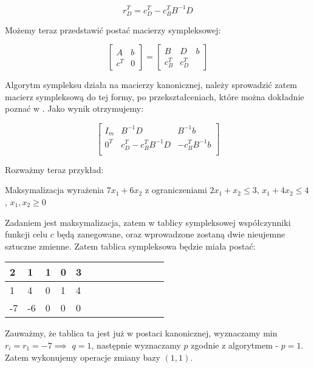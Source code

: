 \documentclass{classrep}
\newcommand{\tnhl}{\tabularnewline\hline}
\begin{document}
\begin{equation}
r^{T}_{D} = c^{T}_{D} - c^{T}_{B} B^{-1} D
\end{equation}

Możemy teraz przedstawić postać macierzy sympleksowej:

\begin{equation}
\left[ \begin{smallmatrix} A & b \\ c^{T} & 0  \end{smallmatrix} \right] =
\left[ \begin{smallmatrix} B &  D & b \\c^{T}_{B} & c^{T}_{D} \end{smallmatrix} \right]
\end{equation}

Algorytm sympleksu działa na macierzy kanonicznej, należy sprowadzić zatem macierz sympleksową do tej formy, po przekształceniach, które można dokładnie poznać w \cite{1}. Jako wynik otrzymujemy:

\begin{equation}
	\begin{bmatrix}
		I_m & B^{-1} D & B^{-1} b \\
		0^{T} & c^{T}_{D} - c^{T}_{B} B^{-1} D & -c^{T} _{B} B^{-1} b   \\
	\end{bmatrix}
\end{equation}

Rozważmy teraz przykład:

Maksymalizacja wyrażenia $7x_1 + 6x_2$
z ograniczeniami $2x_1 + x_2 \leq 3$, $x_1 + 4x_2 \leq 4$, $x_1,x_2\geq 0$

Zadaniem jest maksymalizacja, zatem w tablicy sympleksowej współczynniki funkcji celu $c$ będą zanegowane, oraz wprowadzone zostaną dwie nieujemne sztuczne zmienne. Zatem tablica sympleksowa będzie miała postać:

\begin{table}[H]
\centering
\begin{tabular}{|x{0.7cm}|x{0.7cm}|x{0.7cm}|x{0.7cm}|x{0.7cm}|}
 & 1 & 1 & 0 & 3  \tnhl
1 & 4 & 0 & 1 & 4  \tnhl
-7 & -6 & 0 & 0 & 0 \tnhl
\end{tabular} 
\end{table}

Zauważmy, że tablica ta jest już w postaci kanonicznej, wyznaczamy min $r_i = r_1 = -7 \implies$ $q=1$, następnie wyznaczamy $p$ zgodnie z algorytmem - $p=1$. Zatem wykonujemy operacje zmiany bazy $(1,1)$.
\end{document}
